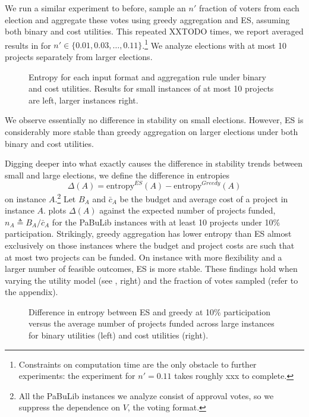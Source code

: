 \documentclass[twoside,11pt]{article}
\newcommand{\mes}{ES}
\newcommand{\pabu}{PaBuLib}
\begin{document}
We run a   similar experiment to before, sample an $n'$ fraction of voters from each election and aggregate these votes  using greedy aggregation and \mes, assuming both binary and cost utilities. This repeated XXTODO times, we report averaged results in  for $n'\in \{0.01, 0.03, \ldots, 0.11\}$.\footnote{Constraints on computation time are the only obstacle to further experiments: the experiment for $n' = 0.11$ takes roughly xxx to complete. }
We analyze elections with at most 10 projects separately from larger elections. 

\begin{figure}[!h]
\begin{center}
\caption{Entropy for each input format  and aggregation rule under binary and cost utilities. Results for small instances of at most 10  projects are left, larger instances right.  
}\label{fig:pabulib:stability}
\end{center}
\vspace{-3mm}
\end{figure}

We observe essentially no difference in stability on small elections. However, \mes{} is considerably more stable than greedy aggregation on larger elections under both binary and cost utilities. 


Digging deeper into what exactly causes the difference in stability trends between small and large elections, we define the difference in entropies 
\[
\Delta(A) = \text{entropy}^{\mes}( A) -  \text{entropy}^{Greedy}( A)
\]
on instance $A$.\footnote{All the \pabu{} instances we analyze consist of approval votes, so we suppress the dependence on $V$, the voting format.} 
Let $B_A$ and $\bar{c}_A$ be the budget and average cost of a project in instance $A$. 
 plots  $\Delta(A)$ against the expected number of projects funded, $n_A \triangleq B_A / \bar{c}_A$ for the  \pabu{} instances with at least 10 projects under 10\% participation.
Strikingly, greedy aggregation has lower entropy than \mes{} almost exclusively on those instances where the budget and project costs are such that at most two projects can be funded. On instance with more flexibility and a larger number of feasible outcomes, \mes{}  is more stable. These findings hold when varying the utility model (see , right) and the fraction of votes sampled (refer to the appendix). 


\begin{figure}[!h]
\begin{center}
\caption{Difference in entropy between \mes{} and greedy at 10\% participation versus the average number of projects funded across large instances for binary utilities (left) and cost utilities (right).   
}\label{fig:pabulib:entvsbudget}
\end{center}
\vspace{-3mm}
\end{figure}
\end{document}
